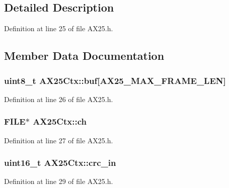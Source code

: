 \subsection{Detailed Description}


Definition at line 25 of file A\+X25.\+h.



\subsection{Member Data Documentation}
\subsubsection[{\texorpdfstring{buf}{buf}}]{\setlength{\rightskip}{0pt plus 5cm}uint8\+\_\+t A\+X25\+Ctx\+::buf\mbox{[}{\bf A\+X25\+\_\+\+M\+A\+X\+\_\+\+F\+R\+A\+M\+E\+\_\+\+L\+EN}\mbox{]}}\hypertarget{struct_a_x25_ctx_aa1dc2643a8179b3a662cbe8b1e78433e}{}\label{struct_a_x25_ctx_aa1dc2643a8179b3a662cbe8b1e78433e}


Definition at line 26 of file A\+X25.\+h.

\subsubsection[{\texorpdfstring{ch}{ch}}]{\setlength{\rightskip}{0pt plus 5cm}F\+I\+LE$\ast$ A\+X25\+Ctx\+::ch}\hypertarget{struct_a_x25_ctx_a1e358851f9443aae7fb781c76044e62f}{}\label{struct_a_x25_ctx_a1e358851f9443aae7fb781c76044e62f}


Definition at line 27 of file A\+X25.\+h.

\subsubsection[{\texorpdfstring{crc\+\_\+in}{crc\_in}}]{\setlength{\rightskip}{0pt plus 5cm}uint16\+\_\+t A\+X25\+Ctx\+::crc\+\_\+in}\hypertarget{struct_a_x25_ctx_acba5c6c48b277cd5520a4060abac3a63}{}\label{struct_a_x25_ctx_acba5c6c48b277cd5520a4060abac3a63}


Definition at line 29 of file A\+X25.\+h.


